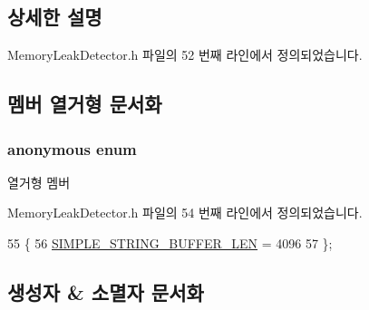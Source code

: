 \subsection{상세한 설명}


Memory\+Leak\+Detector.\+h 파일의 52 번째 라인에서 정의되었습니다.



\subsection{멤버 열거형 문서화}
\subsubsection[{\texorpdfstring{anonymous enum}{anonymous enum}}]{\setlength{\rightskip}{0pt plus 5cm}anonymous enum}\hypertarget{struct_simple_string_buffer_a4efaf4e07364d6302f598569aa7e55dc}{}\label{struct_simple_string_buffer_a4efaf4e07364d6302f598569aa7e55dc}
\begin{Desc}
\item[열거형 멤버]\par
\begin{description}
\item[{\em 
S\+I\+M\+P\+L\+E\+\_\+\+S\+T\+R\+I\+N\+G\+\_\+\+B\+U\+F\+F\+E\+R\+\_\+\+L\+EN\hypertarget{struct_simple_string_buffer_a4efaf4e07364d6302f598569aa7e55dca495824058d0344ce7789bfdfe6658843}{}\label{struct_simple_string_buffer_a4efaf4e07364d6302f598569aa7e55dca495824058d0344ce7789bfdfe6658843}
}]\end{description}
\end{Desc}


Memory\+Leak\+Detector.\+h 파일의 54 번째 라인에서 정의되었습니다.


\begin{DoxyCode}
55     \{
56         \hyperlink{struct_simple_string_buffer_a4efaf4e07364d6302f598569aa7e55dca495824058d0344ce7789bfdfe6658843}{SIMPLE\_STRING\_BUFFER\_LEN} = 4096
57     \};
\end{DoxyCode}


\subsection{생성자 \& 소멸자 문서화}
